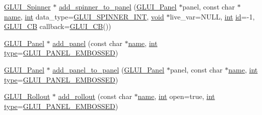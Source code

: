 \begin{DoxyCompactItemize}
\item 
\hyperlink{class_g_l_u_i___spinner}{G\+L\+U\+I\+\_\+\+Spinner} $\ast$ \hyperlink{class_g_l_u_i_a0404acbf84029ccaa28c3f7336c36aac}{add\+\_\+spinner\+\_\+to\+\_\+panel} (\hyperlink{class_g_l_u_i___panel}{G\+L\+U\+I\+\_\+\+Panel} $\ast$panel, const char $\ast$\hyperlink{glext_8h_ad977737dfc9a274a62741b9500c49a32}{name}, \hyperlink{wglext_8h_a500a82aecba06f4550f6849b8099ca21}{int} data\+\_\+type=\hyperlink{glui_8h_ae338c1175e5bb430d7a14d109daee74a}{G\+L\+U\+I\+\_\+\+S\+P\+I\+N\+N\+E\+R\+\_\+\+I\+N\+T}, \hyperlink{wglext_8h_a9e6b7f1933461ef318bb000d6bd13b83}{void} $\ast$live\+\_\+var=N\+U\+L\+L, \hyperlink{wglext_8h_a500a82aecba06f4550f6849b8099ca21}{int} \hyperlink{glext_8h_a58c2a664503e14ffb8f21012aabff3e9}{id}=-\/1, \hyperlink{class_g_l_u_i___c_b}{G\+L\+U\+I\+\_\+\+C\+B} callback=\hyperlink{class_g_l_u_i___c_b}{G\+L\+U\+I\+\_\+\+C\+B}())
\item 
\hyperlink{class_g_l_u_i___panel}{G\+L\+U\+I\+\_\+\+Panel} $\ast$ \hyperlink{class_g_l_u_i_a3b8ffd87d2340041a5a5fab58dbf04d7}{add\+\_\+panel} (const char $\ast$\hyperlink{glext_8h_ad977737dfc9a274a62741b9500c49a32}{name}, \hyperlink{wglext_8h_a500a82aecba06f4550f6849b8099ca21}{int} \hyperlink{glext_8h_ab7c1afc09f67635c2c376638fcc0db5f}{type}=\hyperlink{glui_8h_add54979a7b4391067b8a125ee34f690a}{G\+L\+U\+I\+\_\+\+P\+A\+N\+E\+L\+\_\+\+E\+M\+B\+O\+S\+S\+E\+D})
\item 
\hyperlink{class_g_l_u_i___panel}{G\+L\+U\+I\+\_\+\+Panel} $\ast$ \hyperlink{class_g_l_u_i_aadaa36a373fccc04c87993724b998c70}{add\+\_\+panel\+\_\+to\+\_\+panel} (\hyperlink{class_g_l_u_i___panel}{G\+L\+U\+I\+\_\+\+Panel} $\ast$panel, const char $\ast$\hyperlink{glext_8h_ad977737dfc9a274a62741b9500c49a32}{name}, \hyperlink{wglext_8h_a500a82aecba06f4550f6849b8099ca21}{int} \hyperlink{glext_8h_ab7c1afc09f67635c2c376638fcc0db5f}{type}=\hyperlink{glui_8h_add54979a7b4391067b8a125ee34f690a}{G\+L\+U\+I\+\_\+\+P\+A\+N\+E\+L\+\_\+\+E\+M\+B\+O\+S\+S\+E\+D})
\item 
\hyperlink{class_g_l_u_i___rollout}{G\+L\+U\+I\+\_\+\+Rollout} $\ast$ \hyperlink{class_g_l_u_i_afc1608e235e405b93ea3d346f8036528}{add\+\_\+rollout} (const char $\ast$\hyperlink{glext_8h_ad977737dfc9a274a62741b9500c49a32}{name}, \hyperlink{wglext_8h_a500a82aecba06f4550f6849b8099ca21}{int} open=true, \hyperlink{wglext_8h_a500a82aecba06f4550f6849b8099ca21}{int} \hyperlink{glext_8h_ab7c1afc09f67635c2c376638fcc0db5f}{type}=\hyperlink{glui_8h_add54979a7b4391067b8a125ee34f690a}{G\+L\+U\+I\+\_\+\+P\+A\+N\+E\+L\+\_\+\+E\+M\+B\+O\+S\+S\+E\+D})
\item 

\end{DoxyCompactItemize}
